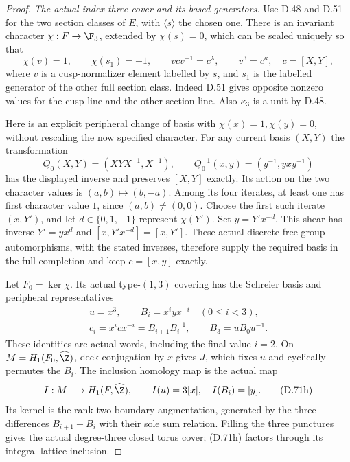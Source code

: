 \begin{proof}
\emph{The actual index-three cover and its based generators.}
Use D.48 and D.51 for the two section classes of
$E$, with $\langle s\rangle$ the chosen one.
There is an invariant character $\chi:F\to\F_3$,
extended by $\chi(s)=0$, which can be scaled
uniquely so that
\[
 \chi(v)=1,\qquad
 \chi(s_1)=-1,\qquad
 vcv^{-1}=c^\lambda,\qquad v^3=c^\kappa ,
 \quad c=[X,Y],
                                                               \tag{D.71e}
\]
where $v$ is a cusp-normalizer element labelled by
$s$, and $s_1$ is the labelled generator of the
other full section class.
Indeed D.51 gives opposite nonzero values for
the cusp line and the other section line.
Also $\kappa_3$ is a unit by D.48.

Here is an explicit peripheral change of basis
with $\chi(x)=1,\chi(y)=0$, without rescaling
the now specified character.
For any current basis $(X,Y)$ the transformation
\[
 Q_0(X,Y)=(XYX^{-1},X^{-1}),\qquad
 Q_0^{-1}(x,y)=(y^{-1},yxy^{-1})
                                                               \tag{D.71f}
\]
has the displayed inverse and preserves
$[X,Y]$ exactly. Its action on the two character
values is $(a,b)\mapsto(b,-a)$.
Among its four iterates, at least one has first
character value $1$, since $(a,b)\ne(0,0)$.
Choose the first such iterate $(x,Y')$,
and let $d\in\{0,1,-1\}$ represent $\chi(Y')$.
Set $y=Y'x^{-d}$.
This shear has inverse $Y'=yx^d$ and
$[x,Y'x^{-d}]=[x,Y']$.
These actual discrete free-group automorphisms,
with the stated inverses, therefore supply
the required basis in the full completion
and keep $c=[x,y]$ exactly.

Let $F_0=\ker\chi$.
Its actual type-$(1,3)$ covering has the
Schreier basis and peripheral representatives
\[
 \begin{gathered}
 u=x^3,\qquad B_i=x^iyx^{-i}\quad(0\leq i<3),\\
 c_i=x^icx^{-i}=B_{i+1}B_i^{-1},\qquad
 B_3=uB_0u^{-1}.
 \end{gathered}                                                \tag{D.71g}
\]
These identities are actual words, including
the final value $i=2$.
On $M=H_1(F_0,\widehat\Z)$, deck conjugation by
$x$ gives $J$, which fixes $u$ and cyclically
permutes the $B_i$.
The inclusion homology map is the actual map
\[
 I:M\longrightarrow H_1(F,\widehat\Z),\qquad
 I(u)=3[x],\quad I(B_i)=[y].
                                                               \tag{D.71h}
\]
Its kernel is the rank-two boundary augmentation,
generated by the three differences $B_{i+1}-B_i$
with their sole sum relation.
Filling the three punctures gives the actual
degree-three closed torus cover; (D.71h) factors
through its integral lattice inclusion.


\end{proof}
